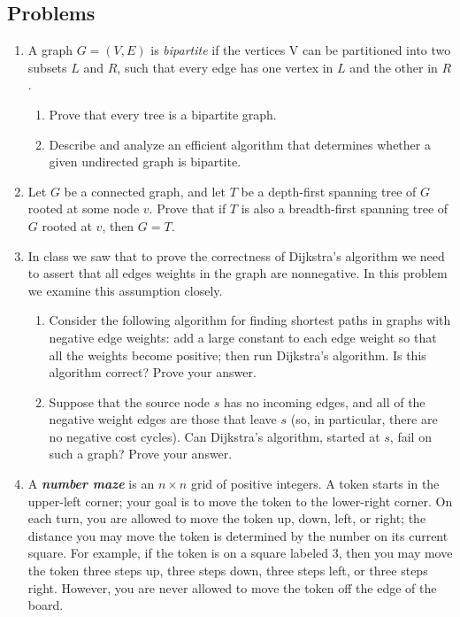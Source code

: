 \documentclass{article}
\begin{document}

\noindent
{}

\subsection*{Problems}

\begin{enumerate}
%
%
\item A graph $G = (V, E)$ is \textit{bipartite} if the vertices V can be partitioned into two subsets $L$ and $R$, such that every edge has one vertex in $L$ and the other in $R$.
\begin{enumerate}
\item Prove that every tree is a bipartite graph.
\item Describe and analyze an efficient algorithm that determines whether a given undirected graph is bipartite.
\end{enumerate}

%
%
\item Let $G$ be a connected graph, and let $T$ be a depth-first spanning tree of $G$ rooted at some node $v$. Prove that if $T$ is also a breadth-first spanning tree of $G$ rooted at $v$, then $G = T$.

%
%
\item In class we saw that to prove the correctness of Dijkstra's algorithm we need to assert that all edges weights in the graph are nonnegative. In this problem we examine this assumption closely. 
\begin{enumerate}
\item Consider the following algorithm for finding shortest paths in graphs with negative edge weights: add a large constant to each edge weight so that all the weights become positive; then run Dijkstra's algorithm. Is this algorithm correct? Prove your answer.
\item Suppose that the source node $s$ has no incoming edges, and all of the negative weight edges are those that leave $s$ (so, in particular, there are no negative cost cycles). Can Dijkstra's algorithm, started at $s$, fail on such a graph? Prove your answer.
\end{enumerate}

%
%
\item A \textbf{\textit{number maze}} is an $n \times n$ grid of positive integers. A token starts in the upper-left corner; your goal is to move the token to the lower-right corner. On each turn, you are allowed to move the token up, down, left, or right; the distance you may move the token is determined by the number on its current square. For example, if the token is on a square labeled 3, then you may move the token three steps up, three steps down, three steps left, or three steps right. However, you are never allowed to move the token off the edge of the board.


\end{enumerate}
\end{document}
